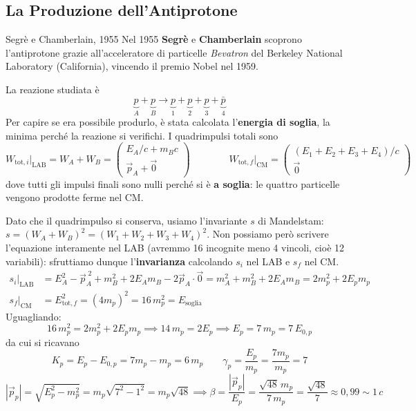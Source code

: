 \subsection{La Produzione dell'Antiprotone}

\begin{notastorica}{Segrè e Chamberlain, 1955}
Nel 1955 \textbf{Segrè} e \textbf{Chamberlain} scoprono l'antiprotone grazie all'acceleratore di particelle \emph{Bevatron} del Berkeley National Laboratory (California), vincendo il premio Nobel nel 1959.
\end{notastorica}

La reazione studiata è
\begin{equation}
    \underbrace{p}_{A} + \underbrace{p}_{B} \longrightarrow \underbrace{p}_{1} + \underbrace{p}_{2} + \underbrace{p}_{3} + \underbrace{\bar{p}}_{4}
\end{equation}
Per capire se era possibile produrlo, è stata calcolata l'\textbf{energia di soglia}, la minima perché la reazione si verifichi. I quadrimpulsi totali sono
\begin{equation*}
    W_{\text{tot},i}\big|_{\text{LAB}} = W_A + W_B = \begin{pmatrix} E_A/c + m_B c \\ \vec{p}_A + \vec{0} \end{pmatrix}
    \qquad\qquad
    W_{\text{tot},f}\big|_{\text{CM}} = \begin{pmatrix} (E_1+E_2+E_3+E_4)/c \\ \vec{0} \end{pmatrix}
\end{equation*}
dove tutti gli impulsi finali sono nulli perché si è \textbf{a soglia}: le quattro particelle vengono prodotte ferme nel CM.

Dato che il quadrimpulso si conserva, usiamo l'invariante $s$ di Mandelstam: $s = (W_A+W_B)^2 = (W_1+W_2+W_3+W_4)^2$. Non possiamo però scrivere l'equazione interamente nel LAB (avremmo 16 incognite meno 4 vincoli, cioè 12 variabili): sfruttiamo dunque l'\textbf{invarianza} calcolando $s_i$ nel LAB e $s_f$ nel CM.
\begin{align*}
    s_i\big|_{\text{LAB}} &= E_A^2 - \vec{p}_A^{\;2} + m_B^2 + 2E_A m_B - 2\vec{p}_A \cdot \vec{0}
     = m_A^2 + m_B^2 + 2E_A m_B = 2m_p^2 + 2E_p m_p \\
    s_f\big|_{\text{CM}} &= E_{\text{tot},f}^2 = (4m_p)^2 = 16\,m_p^2 = E_{\text{soglia}}
\end{align*}
Uguagliando:
\begin{equation}
    16\,m_p^2 = 2m_p^2 + 2E_p m_p
    \implies 14\,m_p = 2E_p
    \implies \boxed{E_p = 7\,m_p = 7\,E_{0,p}}
\end{equation}
da cui si ricavano
\begin{equation*}
    K_p = E_p - E_{0,p} = 7m_p - m_p = 6\,m_p
    \qquad
    \gamma_p = \frac{E_p}{m_p} = \frac{7m_p}{m_p} = 7
\end{equation*}
\begin{equation*}
    |\vec{p}_p| = \sqrt{E_p^2 - m_p^2} = m_p\sqrt{7^2 - 1^2} = m_p\sqrt{48}
    \implies \beta = \frac{|\vec{p}_p|}{E_p} = \frac{\sqrt{48}\,m_p}{7\,m_p} = \frac{\sqrt{48}}{7} \approx 0{,}99 \sim 1\,c
\end{equation*}

